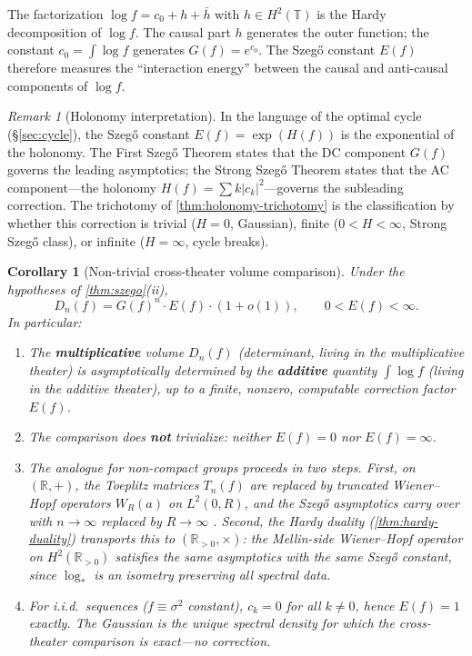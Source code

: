 \documentclass[12pt]{amsart}
\newtheorem{corollary}[theorem]{Corollary}
\theoremstyle{definition}
\theoremstyle{remark}
\newtheorem*{remark}{Remark}
\newcommand{\R}{\mathbb{R}}
\newcommand{\Rpos}{\mathbb{R}_{>0}}
\newcommand{\bT}{\mathbb{T}}
\newcommand{\Htwo}{H^2}
\begin{document}
The factorization $\log f = c_0 + h + \bar{h}$ with $h \in \Htwo(\bT)$ is the Hardy decomposition of $\log f$. The causal part $h$ generates the outer function; the constant $c_0 = \int \log f$ generates $G(f) = e^{c_0}$. The Szeg\H{o} constant $E(f)$ therefore measures the ``interaction energy'' between the causal and anti-causal components of $\log f$.

\begin{remark}[Holonomy interpretation]
In the language of the optimal cycle (\S\ref{sec:cycle}), the Szeg\H{o} constant $E(f) = \exp(H(f))$ is the exponential of the holonomy. The First Szeg\H{o} Theorem states that the DC component $G(f)$ governs the leading asymptotics; the Strong Szeg\H{o} Theorem states that the AC component---the holonomy $H(f) = \sum k|c_k|^2$---governs the subleading correction. The trichotomy of \cref{thm:holonomy-trichotomy} is the classification by whether this correction is trivial ($H = 0$, Gaussian), finite ($0 < H < \infty$, Strong Szeg\H{o} class), or infinite ($H = \infty$, cycle breaks).
\end{remark}

\begin{corollary}[Non-trivial cross-theater volume comparison]\label{cor:nontrivial-volume}
Under the hypotheses of \cref{thm:szego}(ii),
\[
D_n(f) = G(f)^n \cdot E(f) \cdot (1 + o(1)), \qquad 0 < E(f) < \infty.
\]
In particular:
\begin{enumerate}[label=(\roman*)]
\item The \textbf{multiplicative} volume $D_n(f)$ (determinant, living in the multiplicative theater) is asymptotically determined by the \textbf{additive} quantity $\int \log f$ (living in the additive theater), up to a finite, nonzero, computable correction factor $E(f)$.
\item The comparison does \textbf{not} trivialize: neither $E(f) = 0$ nor $E(f) = \infty$.
\item The analogue for non-compact groups proceeds in two steps. First, on $(\R, +)$, the Toeplitz matrices $T_n(f)$ are replaced by truncated \emph{Wiener--Hopf operators} $W_R(a)$ on $L^2(0, R)$, and the Szeg\H{o} asymptotics carry over with $n \to \infty$ replaced by $R \to \infty$ \cite[Chapter~10]{BottcherSilbermann}. Second, the Hardy duality (\cref{thm:hardy-duality}) transports this to $(\Rpos, \times)$: the Mellin-side Wiener--Hopf operator on $\Htwo(\Rpos)$ satisfies the same asymptotics with the same Szeg\H{o} constant, since $\log_*$ is an isometry preserving all spectral data.
\item For i.i.d.\ sequences ($f \equiv \sigma^2$ constant), $c_k = 0$ for all $k \neq 0$, hence $E(f) = 1$ exactly. The Gaussian is the unique spectral density for which the cross-theater comparison is exact---no correction.
\end{enumerate}
\end{corollary}
\end{document}
